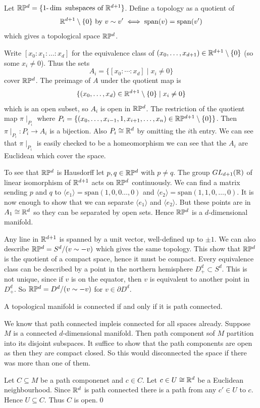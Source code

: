 \documentclass{article}
\begin{document}
\begin{example}
	Let $ \R\mathbb P^d= \{1\text-\dim \ \text{subspaces of}\ \R^{d+1}\} $. Define a topology as a quotient of
	\[
		\R^{d+1} \setminus \{0\} \ \text{by}\ v\sim v'\iff \mathrm{span}(v) = \mathrm{span}(v')
	\]
	which gives a topological space $ \mathbb{R}\mathbb P^d $.\par
	Write $ [x_0:x_1: \dots: x_d] $ for the equivalence class of $ (x_0,\dots, x_{d+1})\in \mathbb{R}^{d+1}\setminus \{0\} $ (so some $ x_i\ne 0 $). Thus the sets
	\[
		A_i=\{[x_0:\cdots : x_d]\mid x_i\ne 0\}
	\]
cover $ \mathbb{R}\mathbb P^d $. The preimage of $ A $ under the quotient map is
\[
	\{(x_0,\dots, x_d)\in \mathbb{R}^{d+1}\setminus \{0\} \mid x_i\ne 0 \}
\]
which is an open subset, so $ A_i $ is open in $ \mathbb{R}\mathbb P^d $. The restriction of the quotient map $ \pi\mid_{P_i} $ where $ P_i = \{(x_0,\dots, x_{i-1},1,x_{i+1},\dots, x_n)\in \mathbb{R}\mathbb P^{d+1}\setminus \{0\}\} $. Then $ \pi\mid_{P_i}:P_i\to A_i $ is a bijection. Also $ P_i\cong \mathbb{R}^d $ by omitting the $ i $th entry. We can see that $ \pi\mid_{P_i} $ is easily checked to be a homeomorphism we can see that the $ A_i $ are Euclidean which cover the space.\par
To see that $ \mathbb{R}\mathbb P^d $ is Hausdorff let $ p,q\in \mathbb{R}\mathbb P^d $ with $ p\ne q $. The group $ GL_{d+1}(\mathbb{R}) $ of linear isomorphism of $ \mathbb{R}^{d+1} $ acts on $ \mathbb{R}\mathbb P^d $ continuously. We can find a matrix sending $ p $ and $ q $ to $ \langle e_1\rangle= \mathrm{span}(1,0, 0\dots, 0) $ and $ \langle e_2\rangle = \mathrm{span}(1,1,0,\dots, 0) $. It is now enough to show that we can separate $ \langle e_1\rangle $ and $ \langle e_2\rangle $. But these points are in $ A_1\cong \mathbb{R}^d $ so they can be separated by open sets. Hence $ \mathbb{R}\mathbb P^d $ is a $ d $-dimensional manifold.
\par
Any line in $ \mathbb{R}^{d+1} $ is spanned by a unit vector, well-defined up to $ \pm 1 $. We can also describe $ \mathbb{R}\mathbb P^d  = S^d/(v\sim -v)$ which gives the same topology. This show that $ \mathbb{R}\mathbb P^d $ is the quotient of a compact space, hence it must be compact. Every equivalence class can be described by a point in the northern hemisphere $ D^d_+ \subset S^d $. This is not unique, since if $ v $ is on the equator, then $ v $ is equivalent to another point in $ D^d_+ $. So $ \mathbb{R}\mathbb P^d=D^d/(v\sim -v) $ for $ v\in \partial D^d $.
\end{example} 
\begin{theorem}
  A topological manifold is connected if and only if it is path connected.
\end{theorem}
\pf We know that path connected impleis connected for all spaces already. Suppose $ M $ is a connected $ d $-dimensional manifold. Then path component sof $ M $ partition into its disjoint subspaces. It suffice to show that the path components are open as then they are compact closed. So this would disconnected the space if there was more than one of them.\par
Let $ C\subseteq M $ be a path componenet and $ c\in C $. Let $ c\in U\cong\mathbb{R}^d $ be a Euclidean neighbourhood. Since $ \mathbb{R}^d $ is path connected there is a path from any $ c'\in U $ to $ c $. Hence $ U\subseteq C $. Thus $ C $ is open.\qed
\end{document}
